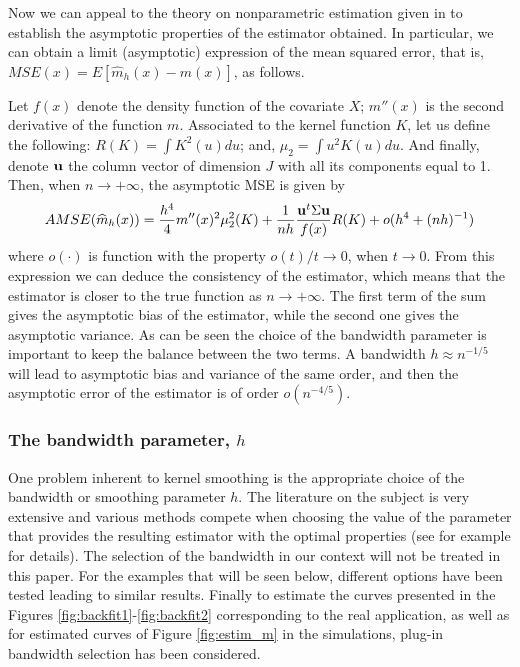 \documentclass[sn-mathphys]{sn-jnl}%
\theoremstyle{thmstyleone}%
\theoremstyle{thmstyletwo}%
\theoremstyle{thmstylethree}%
\begin{document}
Now we can appeal to the theory on nonparametric estimation given in \cite{FG1996} to establish the asymptotic properties of the estimator obtained. In particular, we can obtain a limit (asymptotic)  expression of the mean squared error, that is, $MSE(x)=E\left[\widehat{m}_h(x)-m(x)\right]$, as follows. 

Let $f(x)$ denote the density function of the covariate $X$; $m''(x)$ is the second derivative of the function $m$. Associated to the kernel function $K$, let us define the following: $R(K)=\int K^2(u)du$; and, $\mu_2=\int u^2K(u)du$. And finally, denote ${\bf u}$ the column vector of dimension $J$ with all its components equal to 1. Then, when $n \rightarrow +\infty$, the asymptotic MSE is given by
\begin{equation*}
AMSE(\widehat{m}_h(x))=\frac{h^4}{4}m''(x)^2\mu_2^2(K)+\frac{1}{nh}\frac{{\bf u}^t { \Sigma} {\bf u}}{f(x)}R(K)+o(h^4+(nh)^{-1})
\end{equation*}
where $o(\cdot)$ is function with the property $o(t)/t \rightarrow 0$, when $t \rightarrow 0$. From this expression we can deduce the consistency of the estimator, which means that the estimator is closer to the true function as $n \rightarrow +\infty$. 
The first term of the sum gives the asymptotic bias of the estimator, while the second one gives the asymptotic variance. As can be seen the choice of the bandwidth parameter is important to keep the balance between the two terms. A bandwidth $h \approx n^{-1/5}$ will lead to asymptotic bias and variance of the same order, and then the asymptotic error of the estimator is of order $o(n^{-4/5})$. 

\subsubsection{The bandwidth parameter, $h$}
One problem inherent to kernel smoothing is the appropriate choice of the bandwidth or smoothing parameter $h$. 
The literature on the subject is very extensive and various methods compete when choosing the value of the parameter that provides the resulting estimator with the optimal properties (see for example \cite{FG1996} for details). The selection of the bandwidth in our context will not be treated in this paper. For the examples that will be seen below, different options have been tested leading to similar results. Finally to estimate the curves presented in the Figures \ref{fig:backfit1}-\ref{fig:backfit2} corresponding to the real application, as well as for estimated curves of Figure \ref{fig:estim_m} in the simulations, plug-in bandwidth selection has been considered.
\end{document}
